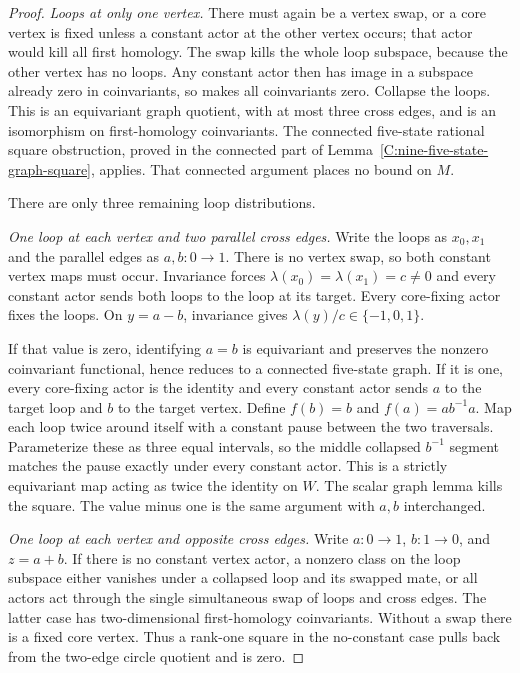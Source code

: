 \begin{proof}
\emph{Loops at only one vertex.}
There must again be a vertex swap, or a core vertex is fixed
unless a constant actor at the other vertex occurs; that
actor would kill all first homology. The swap kills the
whole loop subspace, because the other vertex has no loops.
Any constant actor then has image in a subspace already
zero in coinvariants, so makes all coinvariants zero.
Collapse the loops. This is an equivariant graph quotient,
with at most three cross edges, and is an isomorphism on
first-homology coinvariants. The connected five-state
rational square obstruction, proved in the connected part
of Lemma~\ref{C:nine-five-state-graph-square}, applies.
That connected argument places no bound on $M$.

There are only three remaining loop distributions.

\emph{One loop at each vertex and two parallel cross edges.}
Write the loops as $x_0,x_1$ and the parallel edges as
$a,b:0\to1$. There is no vertex swap, so both constant
vertex maps must occur. Invariance forces
$\lambda(x_0)=\lambda(x_1)=c\ne0$ and every constant
actor sends both loops to the loop at its target.
Every core-fixing actor fixes the loops.
On $y=a-b$, invariance gives
$\lambda(y)/c\in\{-1,0,1\}$.

If that value is zero, identifying $a=b$ is equivariant
and preserves the nonzero coinvariant functional, hence
reduces to a connected five-state graph. If it is one,
every core-fixing actor is the identity and every constant
actor sends $a$ to the target loop and $b$ to the target
vertex. Define $f(b)=b$ and $f(a)=ab^{-1}a$.
Map each loop twice around itself with a constant pause
between the two traversals. Parameterize these as three
equal intervals, so the middle collapsed $b^{-1}$ segment
matches the pause exactly under every constant actor.
This is a strictly equivariant map acting as twice the
identity on $W$. The scalar graph lemma kills the square.
The value minus one is the same argument with $a,b$
interchanged.

\emph{One loop at each vertex and opposite cross edges.}
Write $a:0\to1$, $b:1\to0$, and $z=a+b$.
If there is no constant vertex actor, a nonzero class on
the loop subspace either vanishes under a collapsed loop
and its swapped mate, or all actors act through the single
simultaneous swap of loops and cross edges. The latter
case has two-dimensional first-homology coinvariants.
Without a swap there is a fixed core vertex. Thus a rank-one
square in the no-constant case pulls back from the two-edge
circle quotient and is zero.


\end{proof}
